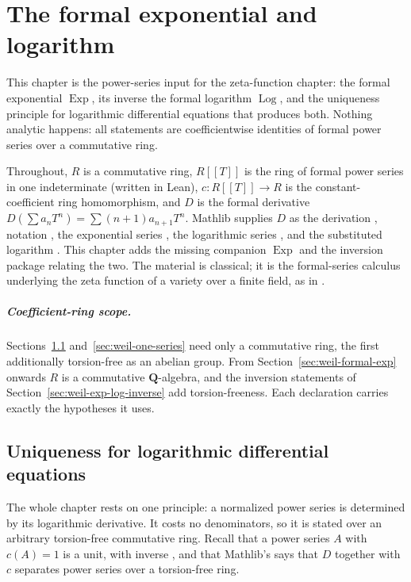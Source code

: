 \chapter{The formal exponential and logarithm}\label{chap:weil-formal-exp-log}

This chapter is the power-series input for the zeta-function chapter: the
formal exponential $\operatorname{Exp}$, its inverse the formal logarithm
$\operatorname{Log}$, and the uniqueness principle for logarithmic
differential equations that produces both.  Nothing analytic happens: all
statements are coefficientwise identities of formal power series over a
commutative ring.

Throughout, $R$ is a commutative ring, $R[[T]]$ is the ring of formal power
series in one indeterminate (written \texttt{} in Lean),
$c\colon R[[T]]\to R$ is the constant-coefficient ring homomorphism, and $D$
is the formal derivative $D(\sum a_nT^n)=\sum(n+1)a_{n+1}T^n$.  Mathlib
supplies $D$ as the derivation \texttt{},
notation \texttt{}, the exponential series
\texttt{}, the logarithmic series
\texttt{}, and the substituted logarithm
\texttt{}.  This chapter adds the missing
companion $\operatorname{Exp}$ and the inversion package relating the two.
The material is classical; it is the formal-series calculus underlying the
zeta function of a variety over a finite field, as in
\cite[Appendix~C]{Hartshorne}.

\paragraph{Coefficient-ring scope.}
Sections~\ref{sec:weil-log-ode} and~\ref{sec:weil-one-series} need only a
commutative ring, the first additionally torsion-free as an abelian group.
From Section~\ref{sec:weil-formal-exp} onwards $R$ is a commutative
$\mathbf Q$-algebra, and the inversion statements of
Section~\ref{sec:weil-exp-log-inverse} add torsion-freeness.  Each
declaration carries exactly the hypotheses it uses.

\section{Uniqueness for logarithmic differential equations}
\label{sec:weil-log-ode}

The whole chapter rests on one principle: a normalized power series is
determined by its logarithmic derivative.  It costs no denominators, so it is
stated over an arbitrary torsion-free commutative ring.  Recall that a power
series $A$ with $c(A)=1$ is a unit, with inverse
\texttt{}, and that Mathlib's
\texttt{} says that $D$ together with
$c$ separates power series over a torsion-free ring.

